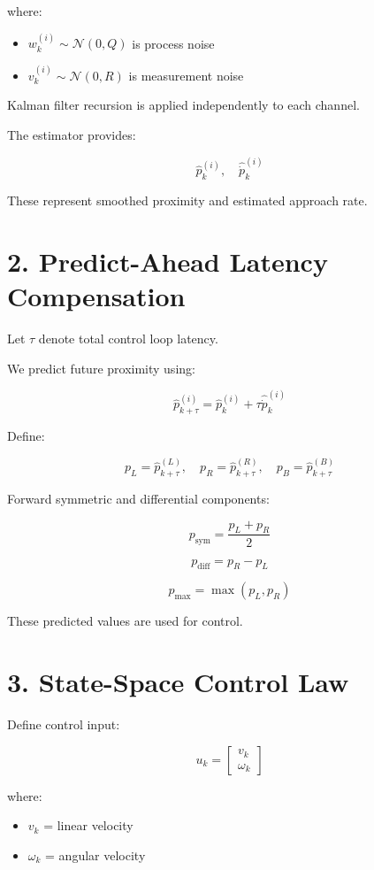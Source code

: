 \documentclass[11pt]{article}
\begin{document}
where:

\begin{itemize}
    \item $w_k^{(i)} \sim \mathcal{N}(0, Q)$ is process noise
    \item $v_k^{(i)} \sim \mathcal{N}(0, R)$ is measurement noise
\end{itemize}

Kalman filter recursion is applied independently to each channel.

The estimator provides:

\[
\hat{p}_k^{(i)}, \quad \hat{\dot{p}}_k^{(i)}
\]

These represent smoothed proximity and estimated approach rate.

\section{2. Predict-Ahead Latency Compensation}

Let $\tau$ denote total control loop latency.

We predict future proximity using:

\[
\hat{p}_{k+\tau}^{(i)} =
\hat{p}_k^{(i)} + \tau \hat{\dot{p}}_k^{(i)}
\]

Define:

\[
p_L = \hat{p}_{k+\tau}^{(L)}, \quad
p_R = \hat{p}_{k+\tau}^{(R)}, \quad
p_B = \hat{p}_{k+\tau}^{(B)}
\]

Forward symmetric and differential components:

\[
p_{\text{sym}} = \frac{p_L + p_R}{2}
\]

\[
p_{\text{diff}} = p_R - p_L
\]

\[
p_{\max} = \max(p_L, p_R)
\]

These predicted values are used for control.

\section{3. State-Space Control Law}

Define control input:

\[
u_k =
\begin{bmatrix}
v_k \\
\omega_k
\end{bmatrix}
\]

where:
\begin{itemize}
    \item $v_k$ = linear velocity
    \item $\omega_k$ = angular velocity
\end{itemize}
\end{document}
